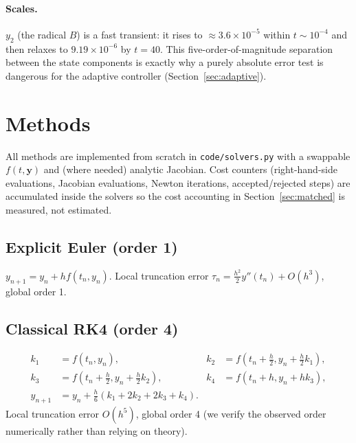 ﻿\documentclass[11pt,a4paper]{article}
\newcommand{\yy}{\mathbf{y}}
\begin{document}
\paragraph{Scales.}  $y_2$ (the radical $B$) is a fast transient: it rises to
$\approx 3.6\times10^{-5}$ within $t\sim10^{-4}$ and then relaxes to
$9.19\times10^{-6}$ by $t=40$.  This five-order-of-magnitude separation between
the state components is exactly why a purely absolute error test is dangerous
for the adaptive controller (Section~\ref{sec:adaptive}).

\section{Methods}\label{sec:methods}
All methods are implemented from scratch in \texttt{code/solvers.py} with a
swappable $f(t,\yy)$ and (where needed) analytic Jacobian.  Cost counters
(right-hand-side evaluations, Jacobian evaluations, Newton iterations,
accepted/rejected steps) are accumulated inside the solvers so the cost
accounting in Section~\ref{sec:matched} is measured, not estimated.

\subsection{Explicit Euler (order 1)}
$y_{n+1}=y_n+hf(t_n,y_n)$.  Local truncation error
$\tau_n=\tfrac{h^2}{2}y''(t_n)+O(h^3)$, global order 1.

\subsection{Classical RK4 (order 4)}
\begin{align*}
k_1&=f(t_n,y_n), & k_2&=f(t_n+\tfrac{h}{2},y_n+\tfrac{h}{2}k_1),\\
k_3&=f(t_n+\tfrac{h}{2},y_n+\tfrac{h}{2}k_2), & k_4&=f(t_n+h,y_n+hk_3),\\
y_{n+1}&=y_n+\tfrac{h}{6}(k_1+2k_2+2k_3+k_4).
\end{align*}
Local truncation error $O(h^5)$, global order 4 (we verify the observed order
numerically rather than relying on theory).
\end{document}

